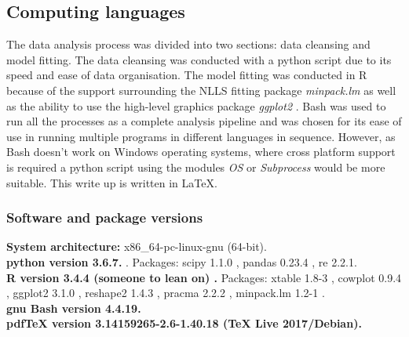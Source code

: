 \documentclass[11pt]{article}
\begin{document}
\begin{linenumbers}
\subsection{Computing languages}
The data analysis process was divided into two sections: data cleansing and model fitting. The data cleansing was conducted with a python \citep{python} script due to its speed and ease of data organisation. The model fitting was conducted in R \citep{R2018} because of the support surrounding the NLLS fitting package \textit{minpack.lm} \citep{Timur2016} as well as the ability to use the high-level graphics package \textit{ggplot2} \citep{Wickham2016}. Bash was used to run all the processes as a complete analysis pipeline and was chosen for its ease of use in running multiple programs in different languages in sequence. However, as Bash doesn't work on Windows operating systems, where cross platform support is required a python script using the modules \textit{OS} or \textit{Subprocess} would be more suitable. This write up is written in \LaTeX. 

\subsubsection{Software and package versions}
\textbf{System architecture:} x86\_64-pc-linux-gnu (64-bit).\\
\textbf{python version 3.6.7.} \citep{python}. Packages: scipy 1.1.0 \citep{Jones2001}, pandas 0.23.4 \citep{Mckinney2011}, re 2.2.1.\\
\textbf{R version 3.4.4 (someone to lean on) \citep{R2018}.} Packages: xtable 1.8-3 \citep{Dahl2018}, cowplot 0.9.4 \citep{Wilke2019}, ggplot2 3.1.0 \citep{Wickham2016}, reshape2 1.4.3 \citep{Wickham2007}, pracma 2.2.2 \citep{Borchers2018}, minpack.lm 1.2-1 \citep{Timur2016}.\\
\textbf{gnu Bash version 4.4.19.}\\
\textbf{pdfTeX version 3.14159265-2.6-1.40.18 (TeX Live 2017/Debian).}

\end{linenumbers}
\end{document}
